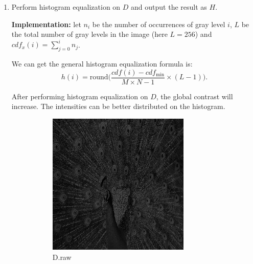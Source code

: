 \documentclass{article}
\newcommand{\tb}{\textbf}
\begin{document}
\begin{enumerate}[label=(\alph*)]
    \item Perform histogram equalization on $D$ and output the result as $H$.
    
    \tb{Implementation:}
    let $n_i$ be the number of occurrences of gray level $i$, $L$ be the total number of gray levels in the image (here $L = 256$) and $cdf_x(i) = \sum_{j = 0}^i n_j$.
    
    We can get the general histogram equalization formula is: $$h(i) = \mbox{round}\Big(\frac{cdf(i) - cdf_{\min}}{M \times N - 1} \times (L - 1) \Big).$$
    
    After performing histogram equalization on $D$, the global contrast will increase. The intensities can be better distributed on the histogram.
    
    \begin{figure}[!htb]
        \centering
        \begin{subfigure}[b]{0.3\textwidth}
            \includegraphics[width=\textwidth]{img/D.png}
            \caption{D.raw}
        \end{subfigure}
        ~
        \begin{subfigure}[b]{0.3\textwidth}

\end{subfigure}
\end{figure}
\end{enumerate}
\end{document}
